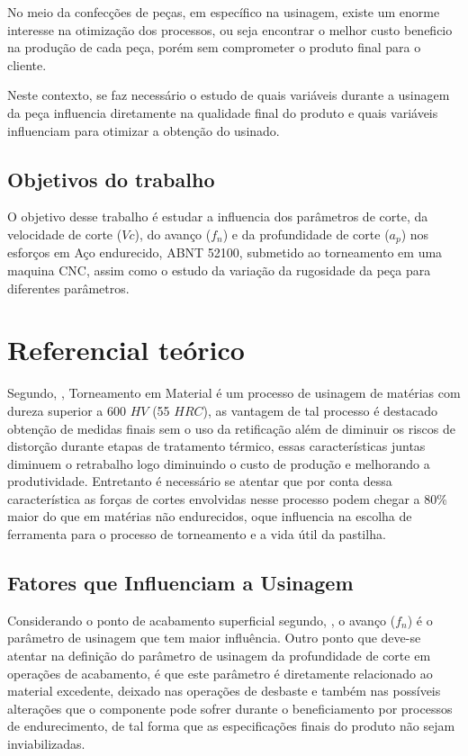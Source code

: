 \documentclass[deposito, acronym, symbols]{fei}
\begin{document}
No meio da confecções de peças, em específico na usinagem, existe um enorme interesse na otimização dos processos, ou seja encontrar o melhor custo beneficio na produção de cada peça, porém sem comprometer o produto final para o cliente.

Neste contexto, se faz necessário o estudo de quais variáveis durante a usinagem da peça influencia diretamente na qualidade final do produto e quais variáveis influenciam para otimizar a obtenção do usinado.


\section{Objetivos do trabalho}

O objetivo desse trabalho é estudar a influencia dos parâmetros de corte, da velocidade de corte ($Vc$), do avanço ($f_n$) e da profundidade de corte ($a_p$) nos esforços em Aço endurecido, ABNT 52100, submetido ao torneamento em uma maquina CNC, assim como o estudo da variação da rugosidade da peça para diferentes parâmetros. 

\chapter{Referencial teórico}

Segundo, \textcite{farias2009analise}, Torneamento em Material é um processo de usinagem de matérias com dureza superior a 600 $HV$ (55 $HRC$), as vantagem de tal processo é destacado obtenção de medidas finais sem o uso da retificação além de diminuir os riscos de distorção durante etapas de tratamento térmico, essas características juntas diminuem o retrabalho logo diminuindo o custo de produção e melhorando a produtividade. Entretanto é necessário se atentar que por conta dessa característica as forças de cortes envolvidas nesse processo podem chegar a 80\% maior do que em matérias não endurecidos, oque influencia na escolha de ferramenta para o processo de torneamento e a vida útil da pastilha.

\section{Fatores que Influenciam a Usinagem}

Considerando o ponto de acabamento superficial segundo, \textcite{gomes2016estudo}, o avanço ($f_n$) é o parâmetro de usinagem que tem maior influência. Outro ponto que deve-se atentar na definição do parâmetro de usinagem da profundidade de corte em operações de acabamento, é que este parâmetro é diretamente relacionado ao material excedente, deixado nas operações de desbaste e também nas possíveis alterações que o componente pode sofrer durante o beneficiamento por processos de endurecimento, de tal forma que as especificações finais do produto não sejam inviabilizadas. 
\end{document}
